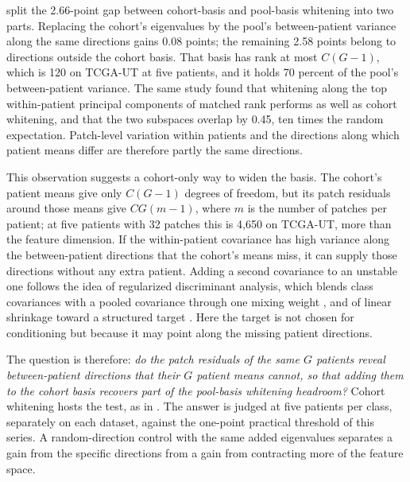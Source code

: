 \documentclass[11pt]{article}
\begin{document}
\citet{queisler2026spectrumRegularization} split the 2.66-point gap between cohort-basis and pool-basis whitening into two parts. Replacing the cohort's eigenvalues by the pool's between-patient variance along the same directions gains 0.08 points; the remaining 2.58 points belong to directions outside the cohort basis. That basis has rank at most $C(G-1)$, which is 120 on TCGA-UT at five patients, and it holds 70 percent of the pool's between-patient variance. The same study found that whitening along the top within-patient principal components of matched rank performs as well as cohort whitening, and that the two subspaces overlap by 0.45, ten times the random expectation. Patch-level variation within patients and the directions along which patient means differ are therefore partly the same directions.

This observation suggests a cohort-only way to widen the basis. The cohort's patient means give only $C(G-1)$ degrees of freedom, but its patch residuals around those means give $CG(m-1)$, where $m$ is the number of patches per patient; at five patients with 32 patches this is 4,650 on TCGA-UT, more than the feature dimension. If the within-patient covariance has high variance along the between-patient directions that the cohort's means miss, it can supply those directions without any extra patient. Adding a second covariance to an unstable one follows the idea of regularized discriminant analysis, which blends class covariances with a pooled covariance through one mixing weight \citep{friedman1989rda}, and of linear shrinkage toward a structured target \citep{ledoit2004wellconditioned}. Here the target is not chosen for conditioning but because it may point along the missing patient directions.

The question is therefore: \emph{do the patch residuals of the same $G$ patients reveal between-patient directions that their $G$ patient means cannot, so that adding them to the cohort basis recovers part of the pool-basis whitening headroom?} Cohort whitening hosts the test, as in \citet{queisler2026spectrumRegularization}. The answer is judged at five patients per class, separately on each dataset, against the one-point practical threshold of this series. A random-direction control with the same added eigenvalues separates a gain from the specific directions from a gain from contracting more of the feature space.
\end{document}
